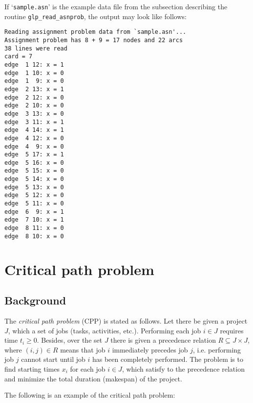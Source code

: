 \documentclass[dvipdfm,11pt]{report}
\begin{document}
If `\verb|sample.asn|' is the example data file from the subsection
describing the routine \verb|glp_read_asnprob|, the output may look
like follows:

\begin{footnotesize}
\begin{verbatim}
Reading assignment problem data from `sample.asn'...
Assignment problem has 8 + 9 = 17 nodes and 22 arcs
38 lines were read
card = 7
edge  1 12: x = 1
edge  1 10: x = 0
edge  1  9: x = 0
edge  2 13: x = 1
edge  2 12: x = 0
edge  2 10: x = 0
edge  3 13: x = 0
edge  3 11: x = 1
edge  4 14: x = 1
edge  4 12: x = 0
edge  4  9: x = 0
edge  5 17: x = 1
edge  5 16: x = 0
edge  5 15: x = 0
edge  5 14: x = 0
edge  5 13: x = 0
edge  5 12: x = 0
edge  5 11: x = 0
edge  6  9: x = 1
edge  7 10: x = 1
edge  8 11: x = 0
edge  8 10: x = 0
\end{verbatim}
\end{footnotesize}


\newpage

\section{Critical path problem}

\subsection{Background}

The {\it critical path problem} (CPP) is stated as follows. Let there
be given a project $J$, which a set of jobs (tasks, activities, etc.).
Performing each job $i\in J$ requires time $t_i\geq 0$. Besides, over
the set $J$ there is given a precedence relation $R\subseteq J\times J$,
where $(i,j)\in R$ means that job $i$ immediately precedes job $j$, i.e.
performing job $j$ cannot start until job $i$ has been completely
performed. The problem is to find starting times $x_i$ for each job
$i\in J$, which satisfy to the precedence relation and minimize the
total duration (makespan) of the project.

The following is an example of the critical path problem:
\end{document}
